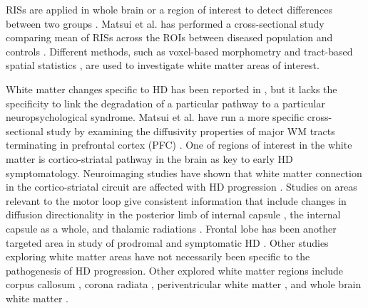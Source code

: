 RISs are applied in whole brain or a region of interest to detect differences between two groups \cite{Snook2007}. Matsui et al. has performed a cross-sectional study comparing mean of RISs across the ROIs between diseased population and controls \cite{Matsui2014}. Different methods, such as voxel-based morphometry \cite{Ashburner2000} and tract-based spatial statistics \cite{Smith2006}, are used to investigate white matter areas of interest.

White matter changes specific to HD has been reported in \cite{Douaud2009}, but it lacks the specificity to link the degradation of a particular pathway to a particular neuropsychological syndrome. Matsui et al. have run a more specific cross-sectional study by examining the diffusivity properties of major WM tracts terminating in prefrontal cortex (PFC) \cite{Matsui2014}.
One of regions of interest in the white matter is cortico-striatal pathway in the brain as key to early HD symptomatology. Neuroimaging studies have shown that white matter connection in the cortico-striatal circuit are affected with HD progression
\cite{Weaver2009, Beglinger2005, Douaud2009}. Studies on areas relevant to the motor loop give consistent information that include changes in diffusion directionality in the posterior limb of internal capsule \cite{Rosas2006, DellaNave2010}, the internal capsule as a whole, and thalamic radiations \cite{Stoffers2010, Bohanna2011}. Frontal lobe has been another targeted area in study of prodromal and symptomatic HD \cite{Reading2005, Rosas2006, DellaNave2010}. Other studies exploring white matter areas have not necessarily been specific to the pathogenesis of HD progression. Other explored white matter regions include corpus callosum \cite{Rosas2006, DellaNave2010, Stoffers2010, Bohanna2011, Weaver2009, Sritharan2010, Muller2011, DiPaola2012, Dumas2012}, corona radiata \cite{DellaNave2010, Stoffers2010, Bohanna2011, Weaver2009}, periventricular white matter \cite{Mascalchi2004}, and whole brain white matter \cite{Rosas2006, Mascalchi2004}.
\newline
